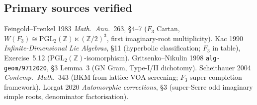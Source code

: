 \documentclass[12pt]{article}
\providecommand{\Z}{\mathbb{Z}}
\providecommand{\FF}{F_3}
\providecommand{\PGL}{\mathrm{PGL}}
\begin{document}
\subsection*{Primary sources verified}

Feingold--Frenkel 1983 \emph{Math.\ Ann.}~263, \S 4--7 ($\FF$
Cartan, $W(\FF) \cong \PGL_2(\Z)\ltimes(\Z/2)^3$, first
imaginary-root multiplicity). Kac 1990 \emph{Infinite-Dimensional
Lie Algebras}, \S 11 (hyperbolic classification; $F_3$ in table),
Exercise~5.12 ($\PGL_2(\Z)$-isomorphism). Gritsenko--Nikulin 1998
\texttt{alg-geom/9712020}, \S 3 Lemma~3 (GN Gram, Type-I/II
dichotomy). Scheithauer 2004 \emph{Contemp.\ Math.}~343 (BKM
from lattice VOA screening; $\FF$ super-completion framework).
Lorgat 2020 \emph{Automorphic corrections}, \S 3 (super-Serre
odd imaginary simple roots, denominator factorisation).
\end{document}

